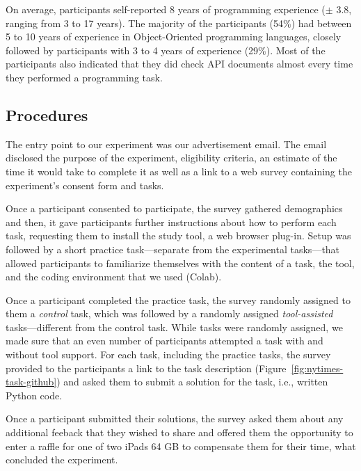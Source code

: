On average, participants self-reported 8 years of programming experience ({\small $\pm$} 3.8, ranging from 3 to 17 years).
The majority of the participants (54\%) had between 5 to 10 years of experience in Object-Oriented programming languages,
closely followed by participants  with  3 to 4 years of experience (29\%). 
Most of the participants also indicated that they did check API documents almost every time they performed a programming task. 







\subsection{Procedures}
\label{cp6:procedures}




The entry point to our experiment was our advertisement email.
The email disclosed the purpose of the experiment, eligibility criteria, an estimate of the time it would take to complete it as well as a link 
to a web survey containing the experiment's consent form and tasks. 


Once a participant consented to participate, the survey gathered demographics and then, 
it gave participants further instructions 
about how to perform each task, requesting them to install the study tool, a web browser plug-in.
Setup was followed by a short practice task---separate from the experimental tasks---that allowed participants to familiarize themselves with the content of a task, the tool, and the coding environment that we used (Colab). 


Once a participant completed the practice task, the survey randomly assigned to them a \textit{control} task, which was followed by a randomly assigned \textit{tool-assisted} tasks---different from the control task. While tasks were randomly assigned, we made sure that an even number of participants attempted a task with and without tool support.
For each task, including the practice tasks, the survey provided to the participants a link 
to the task description (Figure~\ref{fig:nytimes-task-github}) and asked them to submit a solution for the task, i.e., written Python code. 


Once a participant submitted their solutions, the survey
asked them about any additional feeback that they wished to share and 
offered them the opportunity to enter a raffle for one of two iPads 64 GB 
to compensate them for their time, what concluded the experiment.



